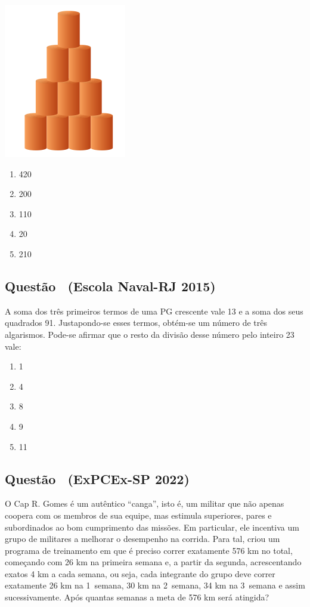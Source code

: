 \documentclass[12pt]{article}
\newcounter{questao}
\newcommand{\novaquestao}[1]{%
  \stepcounter{questao}%
  \subsection*{Questão \thequestao\ (#1)}%
}
\begin{document}
\begin{multicols}{2}
            \begin{center}
                \includegraphics[scale=0.6]{q36.png}
            \end{center}
        
            \begin{enumerate}[label=(\alph*), noitemsep]
                \item 420
                \item 200
                \item 110
                \item 20
                \item 210
            \end{enumerate}

        \novaquestao{Escola Naval-RJ 2015}
            A soma dos três primeiros termos de uma PG crescente vale 13 e a soma dos seus quadrados 91. Justapondo-se esses termos, obtém-se um número de três algarismos. Pode-se afirmar que o resto da divisão desse número pelo inteiro 23 vale:

            \begin{enumerate}[label=(\alph*), noitemsep]
                \item 1
                \item 4
                \item 8
                \item 9
                \item 11
            \end{enumerate}
        
        \novaquestao{ExPCEx-SP 2022}
            O Cap R. Gomes é um autêntico “canga”, isto é, um militar que não apenas coopera com os membros de sua equipe, mas estimula superiores, pares e subordinados ao bom cumprimento das missões. Em particular, ele incentiva um grupo de militares a melhorar o desempenho na corrida. Para tal, criou um programa de treinamento em que é preciso correr exatamente 576 km no total, começando com 26 km na primeira semana e, a partir da segunda, acrescentando exatos 4 km a cada semana, ou seja, cada integrante do grupo deve correr exatamente 26 km na 1\textordfeminine\ semana, 30 km na 2\textordfeminine\  semana, 34 km na 3\textordfeminine\ semana e assim sucessivamente. Após quantas semanas a meta de 576 km será atingida?


\end{multicols}
\end{document}
